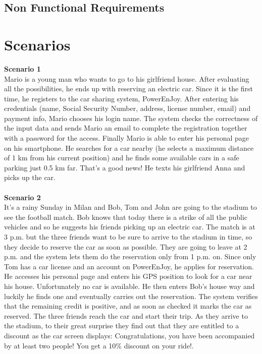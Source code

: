 \documentclass[11pt,a4paper]{report}
\begin{document}
\section{Non Functional Requirements}

\chapter{Scenarios}
\textbf{Scenario 1}\\
Mario is a young man who wants to go to his girlfriend house. After evaluating all the possibilities, he ends up with reserving an electric car. Since it is the first time, he registers to the car sharing system, PowerEnJoy. After entering his credentials (name, Social Security Number, address, license number, email) and payment info, Mario chooses his login name. The system checks the correctness of the input data and sends Mario an email to complete the registration together with a password for the access. 
Finally Mario is able to enter his personal page on his smartphone. He searches for a car nearby (he selects a maximum distance of 1 km from his current position) and he finds some available cars in a safe parking just 0.5 km far. That's a good news! He texts his girlfriend Anna and picks up the car.\\ \noindent \\
\textbf{Scenario 2}\\
It's a rainy Sunday in Milan and Bob, Tom and John are going to the stadium to see the football match. Bob knows that today there is a strike of all the public vehicles and so he suggests his friends picking up an electric car. The match is at 3 p.m. but the three friends want to be sure to arrive to the stadium in time, so they decide to reserve the car as soon as possible. They are going to leave at 2 p.m. and the system lets them do the reservation only from 1 p.m. on. Since only Tom has a car license and an account on PowerEnJoy, he applies for reservation. He accesses his personal page and enters his GPS position to look for a car near his house. Unfortunately no car is available. He then enters Bob's house way and luckily he finds one and eventually carries out the reservation. The system verifies that the remaining credit is positive, and as soon as checked it marks the car as reserved. 
The three friends reach the car and start their trip. As they arrive to the stadium, to their great surprise they find out that they are entitled to a discount as the car screen displays: Congratulations, you have been accompanied by at least two people! You get a 10\% discount on your ride!. \\ \noindent \\
\end{document}
